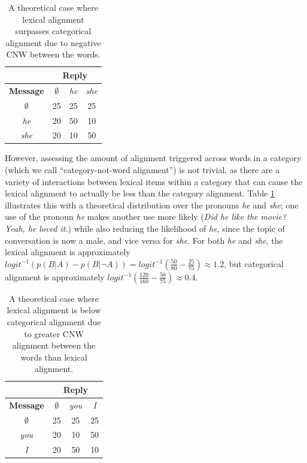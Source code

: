 \documentclass[11pt]{article}
\begin{document}

\begin{table}[t]
\begin{center}
\begin{tabular}{|c||c|c|c|}
\hline
& \multicolumn{3}{|c|}{\bf Reply} \\
\hline
\bf Message & $\emptyset$ & \textit{he} & \textit{she} \\ \hline
$\emptyset$ & 25 & 25 & 25\\
\textit{he} & 20 & 50 & 10 \\
\textit{she} & 20 & 10 & 50 \\
\hline
\end{tabular}
\end{center}
\caption{\label{table:cnw-example1} A theoretical case where lexical alignment surpasses categorical alignment due to negative CNW between the words.}
\end{table}

However, assessing the amount of alignment triggered across words in a category (which we call ``category-not-word alignment'') is not trivial, as there are a variety of interactions between lexical items within a category that can cause the lexical alignment to actually be less than the category alignment. Table \ref{table:cnw-example1} illustrates this with a theoretical distribution over the pronouns \textit{he} and \textit{she}; one use of the pronoun \textit{he} makes another use more likely (\textit{Did he like the movie? Yeah, he loved it.}) while also reducing the likelihood of \textit{he}, since the topic of conversation is now a male, and vice versa for \textit{she}. For both \textit{he} and \textit{she}, the lexical alignment is approximately $logit^{-1}(p(B|A)-p(B|\neg A)) = logit^{-1}(\frac{50}{80}-\frac{25}{75}) \approx 1.2$, but categorical alignment is approximately $logit^{-1}(\frac{120}{160}-\frac{50}{75}) \approx 0.4$.

\begin{table}[h]
\begin{center}
\begin{tabular}{|c||c|c|c|}
\hline
& \multicolumn{3}{|c|}{\bf Reply} \\
\hline
\bf Message & $\emptyset$ & \textit{you} & \textit{I} \\ \hline
$\emptyset$ & 25 & 25 & 25\\
\textit{you} & 20 & 10 & 50 \\
\textit{I} & 20 & 50 & 10 \\
\hline
\end{tabular}
\end{center}
\caption{\label{table:cnw-example2} A theoretical case where lexical alignment is below categorical alignment due to greater CNW alignment between the words than lexical alignment.}
\end{table}
\end{document}
